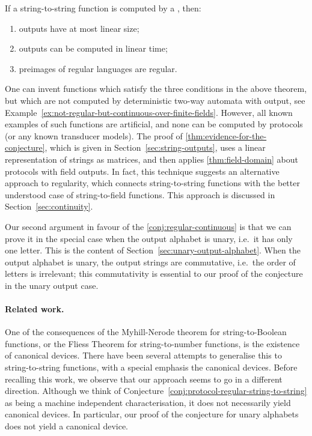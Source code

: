 \begin{theorem}\label{thm:evidence-for-the-conjecture}
    If a string-to-string function  is  computed by a , then:
    \begin{enumerate}
        \item \label{it:linear-size-outputs} outputs have at most linear size;
        \item \label{it:linear-time-computable} outputs can be   computed in linear time;
        \item \label{it:regular-preimages} preimages of regular languages are regular.
    \end{enumerate}
\end{theorem}

One can invent functions which satisfy the three conditions in the above
theorem, but which are not computed by deterministic two-way automata with output, see
Example~\ref{ex:not-regular-but-continuous-over-finite-fields}. However, all
known examples of such functions  are artificial, and none can be computed by
protocols (or any known transducer models).  The proof of
\cref{thm:evidence-for-the-conjecture}, which is given in
Section~\ref{sec:string-outputs}, uses a linear representation of strings as
matrices, and then applies \cref{thm:field-domain} about protocols with field
outputs. In fact, this technique suggests an alternative approach to regularity,
which connects string-to-string functions with the better understood case of
string-to-field functions. This approach is discussed in
Section~\ref{sec:continuity}.

Our second argument in favour of the \cref{conj:regular-continuous} is that we
can prove it in the special case when the output alphabet is unary, i.e.~it has
only one letter. This is the content of
Section~\ref{sec:unary-output-alphabet}. When the output alphabet is unary, the
output strings are commutative, i.e.~the order of letters is irrelevant; this commutativity is essential to our proof of the conjecture in the unary output case. 



\paragraph*{Related work.} One of the consequences of the Myhill-Nerode theorem
for string-to-Boolean functions, or the Fliess Theorem for string-to-number
functions, is the existence of  canonical devices. There have been several
attempts to generalise this to string-to-string functions, with a special
emphasis the canonical devices. Before recalling this work, we observe that our
approach seems to go in a  different direction. Although we think of
Conjecture~\ref{conj:protocol-regular-string-to-string} as being a machine
independent characterisation, it does not necessarily  yield canonical devices.
In particular, our proof of the conjecture for unary alphabets does not yield a
canonical device.

